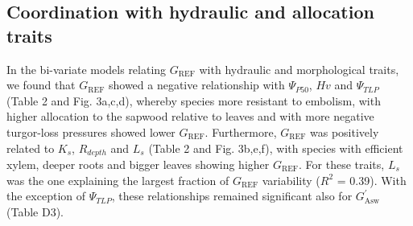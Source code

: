 \documentclass[11pt,twoside]{reedthesis}
\begin{document}
\subsection{Coordination with hydraulic and allocation
traits}\label{coordination-with-hydraulic-and-allocation-traits}

In the bi-variate models relating \(G_{\text{REF}}\) with hydraulic and
morphological traits, we found that \(G_{\text{REF}}\) showed a negative
relationship with \textbar{}\(\Psi_{P50}\)\textbar{}, \(Hv\) and
\textbar{}\(\Psi_{TLP}\)\textbar{} (Table 2 and Fig. 3a,c,d), whereby
species more resistant to embolism, with higher allocation to the
sapwood relative to leaves and with more negative turgor-loss pressures
showed lower \(G_{\text{REF}}\). Furthermore, \(G_{\text{REF}}\) was
positively related to \(K_s\), \(R_{depth}\) and \(L_s\) (Table 2 and
Fig. 3b,e,f), with species with efficient xylem, deeper roots and bigger
leaves showing higher \(G_{\text{REF}}\). For these traits, \(L_s\) was
the one explaining the largest fraction of \(G_{\text{REF}}\)
variability (\(R^2\) = 0.39). With the exception of \(\Psi_{TLP}\),
these relationships remained significant also for \(G_{\text{Asw}}^{'}\)
(Table D3).\par
\end{document}
